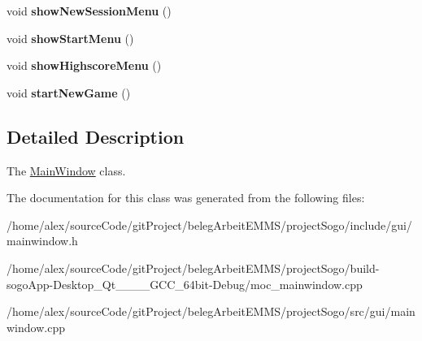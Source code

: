 \begin{DoxyCompactItemize}
\item 
\hypertarget{classMainWindow_ac63b1d94f5cb0ad40b6ce651c8786b18}{void {\bfseries show\-New\-Session\-Menu} ()}\label{classMainWindow_ac63b1d94f5cb0ad40b6ce651c8786b18}

\item 
\hypertarget{classMainWindow_a63f8a7b5189797e75f175da1949a1e76}{void {\bfseries show\-Start\-Menu} ()}\label{classMainWindow_a63f8a7b5189797e75f175da1949a1e76}

\item 
\hypertarget{classMainWindow_a7d14a8a706385f2596c38b3e7c8d8fb0}{void {\bfseries show\-Highscore\-Menu} ()}\label{classMainWindow_a7d14a8a706385f2596c38b3e7c8d8fb0}

\item 
\hypertarget{classMainWindow_a4195422fe1346c1aa9c640715dfe73cb}{void {\bfseries start\-New\-Game} ()}\label{classMainWindow_a4195422fe1346c1aa9c640715dfe73cb}

\end{DoxyCompactItemize}


\subsection{Detailed Description}
The \hyperlink{classMainWindow}{Main\-Window} class. 

The documentation for this class was generated from the following files\-:\begin{DoxyCompactItemize}
\item 
/home/alex/source\-Code/git\-Project/beleg\-Arbeit\-E\-M\-M\-S/project\-Sogo/include/gui/mainwindow.\-h\item 
/home/alex/source\-Code/git\-Project/beleg\-Arbeit\-E\-M\-M\-S/project\-Sogo/build-\/sogo\-App-\/\-Desktop\-\_\-\-Qt\-\_\-\_\-\_\-\_\-\-G\-C\-C\-\_\-64bit-\/\-Debug/moc\-\_\-mainwindow.\-cpp\item 
/home/alex/source\-Code/git\-Project/beleg\-Arbeit\-E\-M\-M\-S/project\-Sogo/src/gui/mainwindow.\-cpp\end{DoxyCompactItemize}
